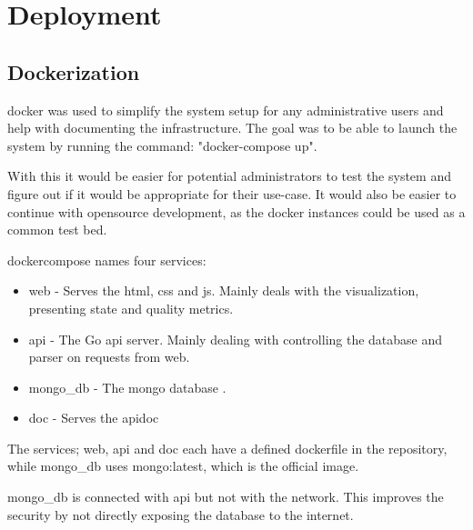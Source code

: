 
\chapter{Deployment}
\label{chap:deployment}

\section{Dockerization}

\Gls{docker} was used to simplify the system setup for any administrative users and help with documenting the infrastructure. The goal was to be able to launch the system by running the command: "docker-compose up".

With this it would be easier for potential administrators to test the system and figure out if it would be appropriate for their use-case. It would also be easier to continue with \gls{opensource} development, as the \gls{docker} instances could be used as a common test bed. 

\Gls{dockercompose} names four services:
\begin{itemize}
    \item web - Serves the \gls{html}, \gls{css} and \gls{js}. Mainly deals with the visualization, presenting state and quality metrics.
    \item api - The Go \gls{api} server. Mainly dealing with controlling the database and parser on requests from web. 
    \item  mongo\_db - The \gls{mongo} database \cite{mongodb}.
    \item doc - Serves the \gls{apidoc} 
\end{itemize}

The services; web, api and doc each have a defined \gls{dockerfile} in the repository, while mongo\_db uses mongo:latest, which is the official image. 

mongo\_db is connected with api but not with the network. This improves the security by not directly exposing the database to the internet.

